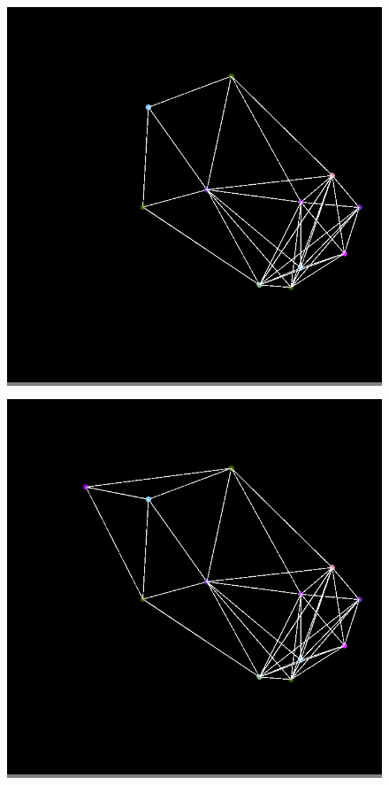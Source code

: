 \documentclass{article}
\begin{document}
\begin{figure}
\begin{minipage}{0.2\textwidth}
            \end{minipage}
            \hspace{\fill}
            \begin{minipage}{0.2\textwidth}
            \colorbox{gray}{\includegraphics[width=\linewidth]{./images/color-11.png}}
            \end{minipage}
            \hspace{\fill}
            \begin{minipage}{0.2\textwidth}
            \colorbox{gray}{\includegraphics[width=\linewidth]{./images/color-12.png}}

\end{minipage}
\end{figure}
\end{document}
